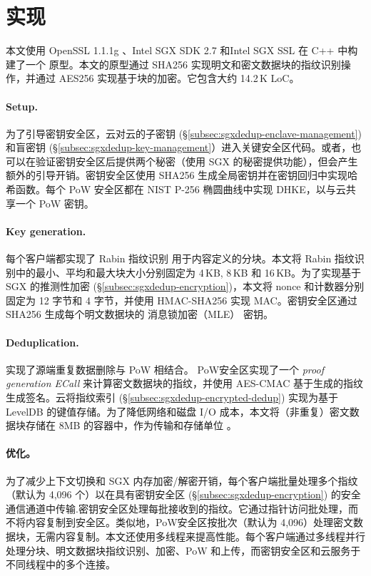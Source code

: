 \section{实现}
\label{sec:sgxdedup-implementation}

本文使用 OpenSSL 1.1.1g \cite{openssl}、Intel SGX SDK 2.7 \cite{sgx} 和Intel SGX SSL \cite{sgxssl} 在 C++ 中构建了一个 \sysnameS 原型。本文的原型通过 SHA256 实现明文和密文数据块的指纹识别操作，并通过 AES256 实现基于块的加密。它包含大约 14.2\,K LoC。

\paragraph*{Setup.} 
为了引导密钥安全区，云对云的子密钥 (\S\ref{subsec:sgxdedup-enclave-management}) 和盲密钥 (\S\ref{subsec:sgxdedup-key-management}）进入关键安全区代码。或者，\sysnameS 也可以在验证密钥安全区后提供两个秘密（使用 SGX \cite{sgx} 的秘密提供功能），但会产生额外的引导开销。密钥安全区使用 SHA256 生成全局密钥并在密钥回归中实现哈希函数。每个 PoW 安全区都在 NIST P-256 椭圆曲线中实现 DHKE，以与云共享一个 PoW 密钥。

\paragraph*{Key generation.} 每个客户端都实现了 Rabin 指纹识别 \cite{rabin81} 用于内容定义的分块。本文将 Rabin 指纹识别中的最小、平均和最大块大小分别固定为 4\,KB, 8\,KB 和 16\,KB。为了实现基于 SGX 的推测性加密 (\S\ref{subsec:sgxdedup-encryption})，本文将 nonce 和计数器分别固定为 12 字节和 4 字节，并使用 HMAC-SHA256 实现 MAC。密钥安全区通过 SHA256 生成每个明文数据块的 消息锁加密（MLE） 密钥。

\paragraph*{Deduplication.} \sysnameS 实现了源端重复数据删除与 PoW 相结合。 PoW安全区实现了一个 \textit{ proof generation ECall} 来计算密文数据块的指纹，并使用 AES-CMAC 基于生成的指纹生成签名。云将指纹索引 (\S\ref{subsec:sgxdedup-encrypted-dedup}) 实现为基于 LevelDB \cite{leveldb} 的键值存储。为了降低网络和磁盘 I/O 成本，本文将（非重复）密文数据块存储在 8MB 的容器中，作为传输和存储单位 \cite{lillibridge13}。

\paragraph*{优化。} 为了减少上下文切换和 SGX 内存加密/解密开销，每个客户端批量处理多个指纹（默认为 4,096 个）以在具有密钥安全区 (\S\ref{subsec:sgxdedup-encryption}) 的安全通信通道中传输.密钥安全区处理每批接收到的指纹。它通过指针访问批处理，而不将内容复制到安全区\cite{harnik18}。类似地，PoW安全区按批次（默认为 4,096）处理密文数据块，无需内容复制。本文还使用多线程来提高性能。每个客户端通过多线程并行处理分块、明文数据块指纹识别、加密、PoW 和上传，而密钥安全区和云服务于不同线程中的多个连接。